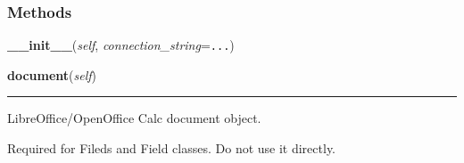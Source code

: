     \label{src:pylibratm:Template}


  \subsubsection{Methods}

    \label{src:pylibratm:Template:__init__}

    \vspace{0.5ex}

\hspace{.8\funcindent}\begin{boxedminipage}{\funcwidth}

    \raggedright \textbf{\_\_init\_\_}(\textit{self}, \textit{connection\_string}={\tt \texttt{...}})

\setlength{\parskip}{2ex}
\setlength{\parskip}{1ex}
    \end{boxedminipage}

    \label{src:pylibratm:Template:document}

    \vspace{0.5ex}

\hspace{.8\funcindent}\begin{boxedminipage}{\funcwidth}

    \raggedright \textbf{document}(\textit{self})

    \vspace{-1.5ex}

    \rule{\textwidth}{0.5\fboxrule}
\setlength{\parskip}{2ex}
    LibreOffice/OpenOffice Calc document object.

    Required for Fileds and Field classes. Do not use it directly.

\setlength{\parskip}{1ex}
    \end{boxedminipage}

    \label{src:pylibratm:Template:fields}

